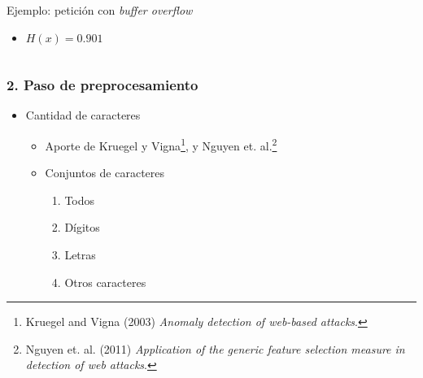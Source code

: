 \begin{frame}[t]
{\begin{columns}
            \begin{block}{\small Ejemplo: petición con \textit{buffer overflow}}
                \begin{itemize}
                    \item
                    \small $H(x) = 0.901$
                \end{itemize}
            \end{block}
        \end{columns}
    }
\end{frame}

\begin{frame}[t]
    \frametitle{2. Paso de preprocesamiento}

    \begin{itemize}
        \item
        Cantidad de caracteres

        \begin{itemize}
            \item
            Aporte de Kruegel y Vigna\footnote{
                Kruegel and Vigna (2003) \textit{Anomaly detection of
                web-based attacks}.},
            y Nguyen et. al.\footnote{
                Nguyen et. al. (2011) \textit{Application of the generic
                feature selection measure in detection of web attacks}.}

            \item
            Conjuntos de caracteres

            \begin{enumerate}
                \item Todos
                \item Dígitos
                \item Letras
                \item Otros caracteres
            \end{enumerate}
        \end{itemize}
    \end{itemize}

\end{frame}
